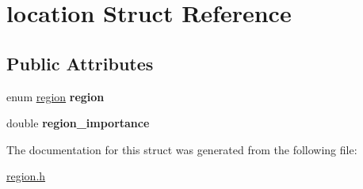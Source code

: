\hypertarget{structlocation}{}\section{location Struct Reference}
\label{structlocation}
\subsection*{Public Attributes}
\begin{DoxyCompactItemize}
\item 
\mbox{\label{structlocation_af54050de86e43d08d5363d06ef198f5d}} 
enum \hyperlink{region_8h_a1b9edddb3735d131c67e9e824f07c402}{region} {\bfseries region}
\item 
\mbox{\label{structlocation_a0e3caadd47e7634ceece3ad4c37419f5}} 
double {\bfseries region\+\_\+importance}
\end{DoxyCompactItemize}


The documentation for this struct was generated from the following file\+:\begin{DoxyCompactItemize}
\item 
\hyperlink{region_8h}{region.\+h}\end{DoxyCompactItemize}
